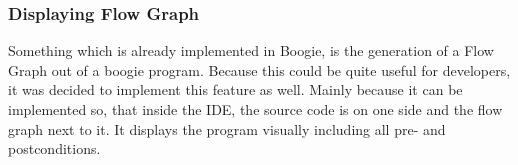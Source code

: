 \subsubsection{Displaying Flow Graph}
Something which is already implemented in Boogie, is the generation of a Flow Graph out of a boogie program. Because this could be quite useful for developers, it was decided to implement this feature as well. Mainly because it can be implemented so, that inside the IDE, the source code is on one side and the flow graph next to it. It displays the program visually including all pre- and postconditions. 